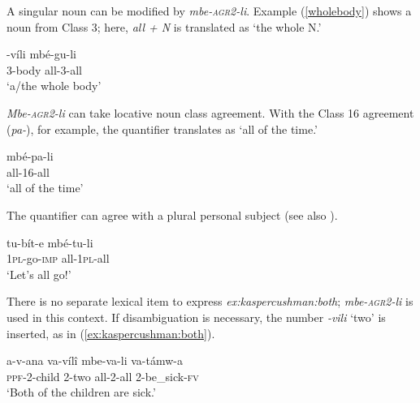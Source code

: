 \documentclass[output=paper,modfonts,nonflat]{langsci/langscibook}
\begin{document}
A singular noun can be modified by \textit{mbe-\textsc{agr2}-li}. Example (\ref{wholebody}) shows a noun from Class 3; here, \textit{all + N} is translated as `the whole N.'

\begin{exe} 

\ex 
\gll {}-víli mbé-gu-li  \label{wholebody} \\   
3-body all-3-all \\
\glt `a/the whole body' \\  

\end{exe}


\textit{Mbe-\textsc{agr2}-li} can take locative noun class agreement. With the Class 16 agreement (\textit{pa-}), for example, the quantifier translates as `all of the time.'

\begin{exe}
\ex 
\gll mbé-pa-li \\
all-16-all \\
\glt `all of the time' \\
\end{exe}


The quantifier can agree with a plural personal subject (see also \citealt{jerro13}).

\begin{exe}   

\ex 
\gll tu-bít-e mbé-tu-li \label{subjectagreement} \\
\textsc{1pl}-go-\textsc{imp} all-\textsc{1pl}-all \\  
\glt `Let's all go!'

\end{exe}


There is no separate lexical item to express \textit{ex:kaspercushman:both}; \textit{mbe-\textsc{agr2}-li} is used in this context.  If disambiguation is necessary, the number \textit{-vili} `two' is inserted, as in (\ref{ex:kaspercushman:both}).

\begin{exe} 

\ex 
\gll a-v-ana va-víl\^i mbe-va-li va-támw-a \\ 
\textsc{ppf}-2-child 2-two all-2-all 2-be\_sick-\textsc{fv} \\ \label{ex:kaspercushman:both}
\glt `Both of the children are sick.' \\

\end{exe}
\end{document}
